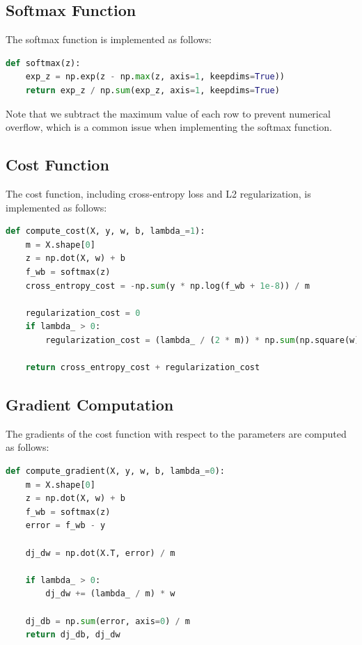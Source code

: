 \documentclass[10pt,journal,compsoc]{IEEEtran}
\begin{document}
\subsection{Softmax Function}
The softmax function is implemented as follows:

\begin{lstlisting}[language=Python]
def softmax(z):
    exp_z = np.exp(z - np.max(z, axis=1, keepdims=True))
    return exp_z / np.sum(exp_z, axis=1, keepdims=True)
\end{lstlisting}

Note that we subtract the maximum value of each row to prevent numerical overflow, which is a common issue when implementing the softmax function.

\subsection{Cost Function}
The cost function, including cross-entropy loss and L2 regularization, is implemented as follows:

\begin{lstlisting}[language=Python]
def compute_cost(X, y, w, b, lambda_=1):
    m = X.shape[0]
    z = np.dot(X, w) + b
    f_wb = softmax(z)
    cross_entropy_cost = -np.sum(y * np.log(f_wb + 1e-8)) / m
    
    regularization_cost = 0
    if lambda_ > 0:
        regularization_cost = (lambda_ / (2 * m)) * np.sum(np.square(w))
    
    return cross_entropy_cost + regularization_cost
\end{lstlisting}

\subsection{Gradient Computation}
The gradients of the cost function with respect to the parameters are computed as follows:

\begin{lstlisting}[language=Python]
def compute_gradient(X, y, w, b, lambda_=0):
    m = X.shape[0]
    z = np.dot(X, w) + b
    f_wb = softmax(z)
    error = f_wb - y
    
    dj_dw = np.dot(X.T, error) / m
    
    if lambda_ > 0:
        dj_dw += (lambda_ / m) * w
        
    dj_db = np.sum(error, axis=0) / m
    return dj_db, dj_dw
\end{lstlisting}
\end{document}
